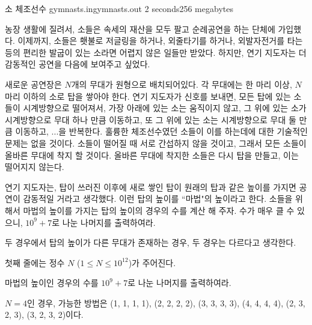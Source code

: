 \begin{problem}{소 체조선수}
	{gymnasts.in}{gymnasts.out}
	{2 seconds}{256 megabytes}{}
	
	농장 생활에 질려서, 소들은 속세의 재산을 모두 팔고 순례공연을 하는 단체에 가입했다. 이제까지, 소들은 횃불로 저글링을 하거나, 외줄타기를 하거나, 외발자전거를 타는 등의 편리한 발굽이 있는 소라면 어렵지 않은 일들만 받았다. 하지만, 연기 지도자는 더 감동적인 공연을 다음에 보여주고 싶었다.
	
	새로운 공연장은 $N$개의 무대가 원형으로 배치되어있다. 각 무대에는 한 마리 이상, $N$ 마리 이하의 소로 탑을 쌓아야 한다. 연기 지도자가 신호를 보내면, 모든 탑에 있는 소들이 시계방향으로 떨어져서, 가장 아래에 있는 소는 움직이지 않고, 그 위에 있는 소가 시계방향으로 무대 하나 만큼 이동하고, 또 그 위에 있는 소는 시계방향으로 무대 둘 만큼 이동하고, ...을 반복한다. 훌륭한 체조선수였던 소들이 이를 하는데에 대한 기술적인 문제는 없을 것이다. 소들이 떨어질 때 서로 간섭하지 않을 것이고, 그래서 모든 소들이 올바른 무대에 착지 할 것이다. 올바른 무대에 착지한 소들은 다시 탑을 만들고, 이는 떨어지지 않는다.
	
	연기 지도자는, 탑이 쓰러진 이후에 새로 쌓인 탑이 원래의 탑과 같은 높이를 가지면 공연이 감동적일 거라고 생각했다. 이런 탑의 높이를 ``마법"의  높이라고 한다. 소들을 위해서 마법의 높이를 가지는 탑의 높이의 경우의 수를 계산 해 주자. 수가 매우 클 수 있으니, $10^9+7$로 나눈 나머지를 출력하여라.
	
	두 경우에서 탑의 높이가 다른 무대가 존재하는 경우, 두 경우는 다르다고 생각한다.
	
	
	
	\InputFile
	
	첫째 줄에는 정수 $N$ ($1 \le N \le 10^{12}$)가 주어진다.
		
	\OutputFile
	
	마법의 높이인 경우의 수를 $10^9+7$로 나눈 나머지를 출력하여라.
	
	\Constraints
		
	\begin{example}
	\end{example}
	
	\Note
	
	$N=4$인 경우, 가능한 방법은 (1, 1, 1, 1), (2, 2, 2, 2), (3, 3, 3, 3), (4, 4, 4, 4), (2, 3, 2, 3), (3, 2, 3, 2)이다.	
	
\end{problem}

